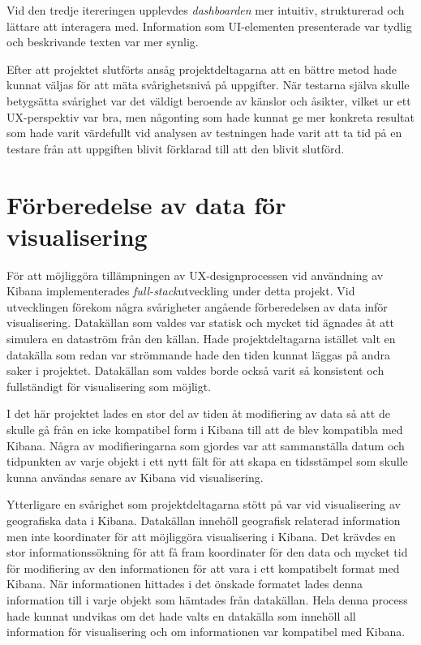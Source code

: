 \documentclass[12pt]{kththesis}
\begin{document}
Vid den tredje itereringen upplevdes \textit{dashboarden} mer intuitiv, strukturerad och lättare att interagera med. Information som UI-elementen presenterade var tydlig och beskrivande texten var mer synlig. 

Efter att projektet slutförts ansåg projektdeltagarna att en bättre metod hade kunnat väljas för att mäta svårighetsnivå på uppgifter. När testarna själva skulle betygsätta svårighet var det väldigt beroende av känslor och åsikter, vilket ur ett UX-perspektiv var bra, men någonting som hade kunnat ge mer konkreta resultat som hade varit värdefullt vid analysen av testningen hade varit att ta tid på en testare från att uppgiften blivit förklarad till att den blivit slutförd. 

\section{Förberedelse av data för visualisering}
För att möjliggöra tillämpningen av UX-designprocessen vid användning av Kibana implementerades \textit{full-stack}utveckling under detta projekt. Vid utvecklingen förekom några svårigheter angående förberedelsen av data inför visualisering. Datakällan som valdes var statisk och mycket tid ägnades åt att simulera en dataström från den källan. Hade projektdeltagarna istället valt en datakälla som redan var strömmande hade den tiden kunnat läggas på andra saker i projektet. Datakällan som valdes borde också varit så konsistent och fullständigt för visualisering som möjligt. 

I det här projektet lades en stor del av tiden åt modifiering av data så att de skulle gå från en icke kompatibel form i Kibana till att de blev kompatibla med Kibana. Några av modifieringarna som gjordes var att sammanställa datum och tidpunkten av varje objekt i ett nytt fält för att skapa en tidsstämpel som skulle kunna användas senare av Kibana vid visualisering. 

Ytterligare en svårighet som projektdeltagarna stött på var vid visualisering av geografiska data i Kibana. Datakällan innehöll geografisk relaterad information men inte koordinater för att möjliggöra visualisering i Kibana. Det krävdes en stor informationssökning för att få fram koordinater för den data och mycket tid för modifiering av den informationen för att vara i ett kompatibelt format med Kibana. När informationen hittades i det önskade formatet lades denna information till i varje objekt som hämtades från datakällan. Hela denna process hade kunnat undvikas om det hade valts en datakälla som innehöll all information för visualisering och om informationen var kompatibel med Kibana.
\end{document}
